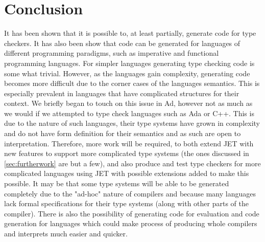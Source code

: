 \section{Conclusion}
It has been shown that it is possible to, at least partially, generate code for type checkers.
It has also been show that code can be generated for languages of different programming paradigms, such as imperative and functional programming languages.
For simpler languages generating type checking code is some what trivial.
However, as the languages gain complexity, generating code becomes more difficult due to the corner cases of the languages semantics.
This is especially prevalent in languages that have complicated structures for their context.
We briefly began to touch on this issue in Ad, however not as much as we would if we attempted to type check languages such as Ada or C++.
This is due to the nature of such languages, their type systems have grown in complexity and do not have form definition for their semantics and as such are open to interpretation.
Therefore, more work will be required, to both extend JET with new features to support more complicated type systems (the ones discussed in \autoref{sec:furtherwork} are but a few), and also produce and test type checkers for more complicated languages using JET with possible extensions added to make this possible.
It may be that some type systems will be able to be generated completely due to the "ad-hoc" nature of compilers and because many languages lack formal specifications for their type systems (along with other parts of the compiler).
There is also the possibility of generating code for evaluation and code generation for languages which could make process of producing whole compilers and interprets much easier and quicker.
